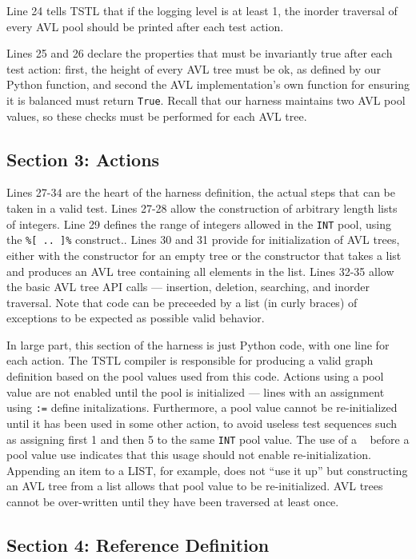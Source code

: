 \documentclass{sig-alternate}
\begin{document}
Line 24 tells TSTL that if the logging level is at least 1, the
inorder traversal of every AVL pool should be printed after each test
action.

Lines 25 and 26 declare the properties that must be invariantly true
after each test action:  first, the height of every AVL tree must be
ok, as defined by our Python function, and second the AVL
implementation's own function for ensuring it is balanced must return
{\tt True}.  Recall that our harness maintains two AVL pool values, so
these checks must be performed for each AVL tree.

\subsection{Section 3: Actions}
\label{sec:actions}

Lines 27-34 are the heart of the harness definition, the actual steps
that can be taken in a valid test.  Lines 27-28 allow the construction
of arbitrary length lists of integers.  Line 29 defines the range of
integers allowed in the {\tt INT} pool, using the {\tt \%[ .. ]\%}
construct..  Lines 30 and 31 provide for initialization of AVL trees,
either with the constructor for an empty tree or the constructor that
takes a list and produces an AVL tree containing all elements in the
list.  Lines 32-35 allow the basic AVL tree API calls --- insertion,
deletion, searching, and inorder traversal.  Note that code can be
preceeded by a list (in curly braces) of exceptions to be expected as possible valid
behavior.

In large part, this section of the harness is just Python
code, with one line for each action.  The TSTL compiler is responsible
for producing a valid graph definition based on the pool values used
from this code.  Actions using a pool value are not enabled until the
pool is initialized --- lines with an assignment using {\tt :=} define
initalizations.  Furthermore, a pool value cannot be re-initialized
until it has been used in some other action, to avoid useless test
sequences such as assigning first 1 and then 5 to the same {\tt INT}
pool value.  The use of a ~ before a pool value use indicates that
this usage should not enable re-initialization.  Appending an item to
a LIST, for example, does not ``use it up'' but constructing an AVL
tree from a list allows that pool value to be re-initialized.  AVL
trees cannot be over-written until they have been traversed at least
once.


\subsection{Section 4: Reference Definition}
\end{document}
